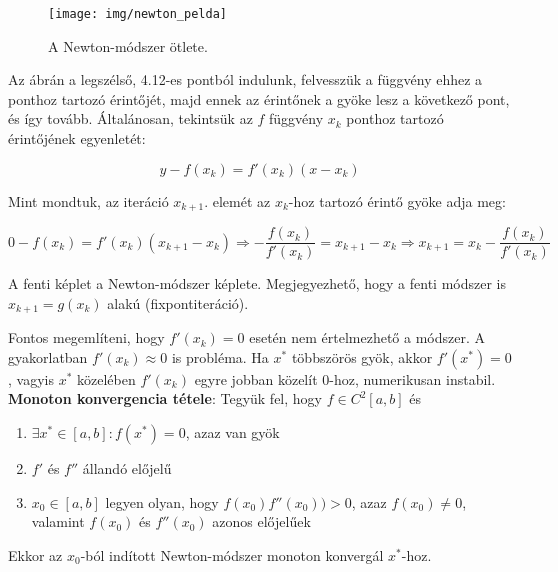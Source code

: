 \documentclass[margin=0px]{article}
\begin{document}
	\begin{figure}[H]
		\centering
		\texttt{[image: img/newton\_pelda]}
		\caption{A Newton-módszer ötlete.}
		\label{fig:newton_pelda}
	\end{figure}
	
	Az ábrán a legszélső, 4.12-es pontból indulunk, felvesszük a függvény ehhez a ponthoz tartozó
	érintőjét, majd ennek az érintőnek a gyöke lesz a következő pont, és így tovább. Általánosan,
	tekintsük az $f$ függvény $x_{k}$ ponthoz tartozó érintőjének egyenletét:
	
	\begin{displaymath}
		y - f(x_{k}) = f'(x_{k}) (x-x_{k})
	\end{displaymath}
	
	\noindent Mint mondtuk, az iteráció $x_{k+1}$. elemét az $x_{k}$-hoz tartozó érintő gyöke adja meg:
	
	\begin{displaymath}
		0 - f(x_{k}) = f'(x_{k}) (x_{k+1}-x_{k}) \Rightarrow
		- \frac{f(x_{k})}{f'(x_{k})} = x_{k+1} - x_{k} \Rightarrow
		x_{k+1} = x_{k} - \frac{f(x_{k})}{f'(x_{k})}
	\end{displaymath}
	
	A fenti képlet a Newton-módszer képlete. Megjegyezhető, hogy a fenti módszer is $x_{k+1} = g(x_{k})$
	alakú (fixpontiteráció).
	
	Fontos megemlíteni, hogy $f'(x_{k}) = 0$ esetén nem értelmezhető a módszer. A gyakorlatban $f'(x_{k}) \approx 0$ is probléma.
	Ha $x^{*}$ többszörös gyök, akkor $f'(x^{*}) = 0$, vagyis $x^{*}$ közelében $f'(x_{k})$ egyre jobban közelít $0$-hoz, numerikusan
	instabil.\\
	
	\noindent \textbf{Monoton konvergencia tétele}: Tegyük fel, hogy $f \in C^{2}[a,b]$ és
	\begin{enumerate}
		\item	$\exists x^{*} \in [a,b] : f(x^{*}) = 0$, azaz van gyök
		
		\item	$f'$ és $f''$ állandó előjelű
		
		\item	$x_{0} \in [a,b]$ legyen olyan, hogy $f(x_{0}) f''(x_{0})) >0$, azaz $f(x_{0}) \not = 0$, valamint $f(x_{0})$ és $f''(x_{0})$
		azonos előjelűek
	\end{enumerate}
	
	\noindent Ekkor az $x_{0}$-ból indított Newton-módszer monoton konvergál $x^{*}$-hoz.
	
\end{document}
